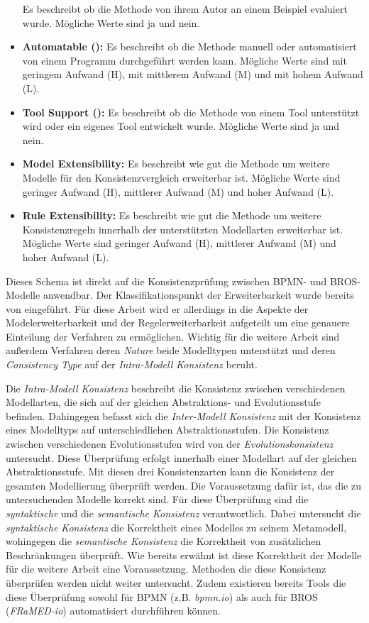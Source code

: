 \begin{itemize}
    Es beschreibt ob die Methode von ihrem Autor an einem Beispiel evaluiert wurde.
    Mögliche Werte sind ja und nein. 
    \item \textbf{Automatable (\cite{Usman2008}):}
    Es beschreibt ob die Methode manuell oder automatisiert von einem Programm durchgeführt werden kann.
    Mögliche Werte sind mit geringem Aufwand (H), mit mittlerem Aufwand (M) und mit hohem Aufwand (L).
    \item \textbf{Tool Support (\cite{Usman2008}):}
    Es beschreibt ob die Methode von einem Tool unterstützt wird oder ein eigenes Tool entwickelt wurde.
    Mögliche Werte sind ja und nein.
    \item \textbf{Model Extensibility:}
    Es beschreibt wie gut die Methode um weitere Modelle für den Konsistenzvergleich erweiterbar ist.
    Mögliche Werte sind geringer Aufwand (H), mittlerer Aufwand (M) und hoher Aufwand (L).
    \item \textbf{Rule Extensibility:}
    Es beschreibt wie gut die Methode um weitere Konsistenzregeln innerhalb der unterstützten Modellarten erweiterbar ist.
    Mögliche Werte sind geringer Aufwand (H), mittlerer Aufwand (M) und hoher Aufwand (L).
\end{itemize}


Dieses Schema ist direkt auf die Konsistenzprüfung zwischen BPMN- und BROS-Modelle anwendbar.
Der Klassifikationspunkt der Erweiterbarkeit wurde bereits von \cite{Lucas2009} eingeführt.
Für diese Arbeit wird er allerdings in die Aspekte der Modelerweiterbarkeit und der Regelerweiterbarkeit aufgeteilt um eine genauere Einteilung der Verfahren zu ermöglichen.
Wichtig für die weitere Arbeit sind außerdem Verfahren deren \emph{Nature} beide Modelltypen unterstützt und deren \emph{Consistency Type} auf der \emph{Intra-Modell Konsistenz} beruht.

Die \emph{Intra-Modell Konsistenz} beschreibt die Konsistenz zwischen verschiedenen Modellarten, die sich auf der gleichen Abstraktions- und Evolutionsstufe befinden.
Dahingegen befasst sich die \emph{Inter-Modell Konsistenz} mit der Konsistenz eines Modelltyps auf unterschiedlichen Abstraktionsstufen.
Die Konsistenz zwischen verschiedenen Evolutionsstufen wird von der \emph{Evolutionskonsistenz} untersucht.
Diese Überprüfung erfolgt innerhalb einer Modellart auf der gleichen Abstraktionsstufe.
Mit diesen drei Konsistenzarten kann die Konsistenz der gesamten Modellierung überprüft werden.
Die Voraussetzung dafür ist, das die zu untersuchenden Modelle korrekt sind.
Für diese Überprüfung sind die \emph{syntaktische} und die \emph{semantische Konsistenz} verantwortlich.
Dabei untersucht die \emph{syntaktische Konsistenz} die Korrektheit eines Modelles zu seinem Metamodell, wohingegen die \emph{semantische Konsistenz} die Korrektheit von zusätzlichen Beschränkungen überprüft.
Wie bereits erwähnt ist diese Korrektheit der Modelle für die weitere Arbeit eine Voraussetzung.
Methoden die diese Konsistenz überprüfen werden nicht weiter untersucht.
Zudem existieren bereits Tools die diese Überprüfung sowohl für BPMN (z.B. \emph{bpmn.io}) als auch für BROS (\emph{FRaMED-io}) automatisiert durchführen können.

